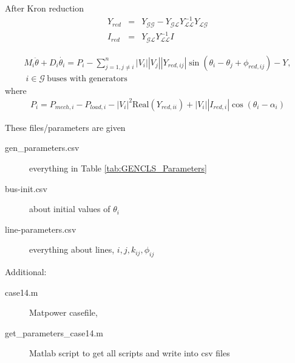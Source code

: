 \documentclass[a4paper,11pt]{article}
\begin{document}
After Kron reduction
\begin{eqnarray}
Y_{red} &=& Y_{\mathcal{G}\mathcal{G}} - Y_{\mathcal{G}\mathcal{L}} Y_{\mathcal{L}\mathcal{L}}^{-1} Y_{\mathcal{L}\mathcal{G}} \\
I_{red} &=& Y_{\mathcal{G}\mathcal{L}}Y_{\mathcal{L}\mathcal{L}}^{-1} I
\end{eqnarray}

\begin{eqnarray}
M_i \ddot{\theta} + D_i \dot{\theta_i} = P_i - \sum_{j=1, j\ne i}^n |V_i| |V_j| |Y_{red,ij}| \sin(\theta_i - \theta_j + \phi_{red,ij}) - Y_{},\\
~i \in \mathcal{G}~\text{buses with generators}
\end{eqnarray}
where 
\begin{eqnarray}
P_i = P_{mech,i} - P_{load,i} - |V_i|^2 \text{Real}(Y_{red,ii}) + |V_i| |I_{red,i}| \cos(\theta_i - \alpha_i)
\end{eqnarray}

These files/parameters are given
\begin{description}
\item[gen\_parameters.csv] everything in Table \ref{tab:GENCLS_Parameters}
\item[bus-init.csv] about initial values of $\theta_i$
\item[line-parameters.csv] everything about lines, $i,j,k_{ij},\phi_{ij}$
\end{description}
Additional:
\begin{description}
\item[case14.m] Matpower casefile,
\item[get\_parameters\_case14.m] Matlab script to get all scripts and write into csv files
\end{description}


\end{document}
